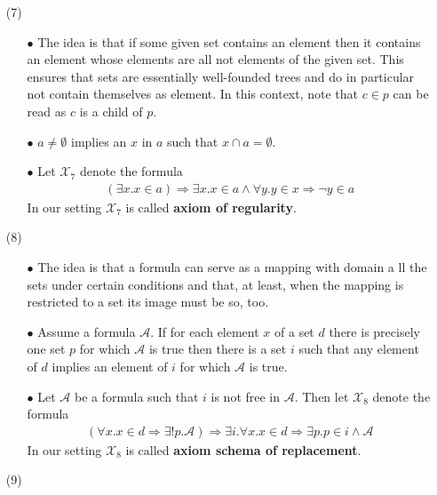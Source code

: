 \begin{enumerate}
\begin{enumerate}
\end{enumerate}
\item[(7)]
\begin{enumerate}
\item[$\bullet$]
The idea is that if some given set contains an element then it contains an element whose elements are all not elements of the given set. This ensures that sets are essentially well-founded trees and do in particular not contain themselves as element. In this context, note that $c \in p$ can be read as $c$ is a child of $p$.
\item[$\bullet$]
$a \neq \emptyset$ implies an $x$ in $a$ such that $x \cap a = \emptyset$.
\item[$\bullet$]
Let $\mathcal{X}_{7}$ denote the formula
\begin{align*}
  \left(
    \exists
    x
    .
    x
    \in
    a
  \right)
  \Rightarrow
  \exists
  x
  .
  x
  \in
  a
  \land
  \forall
  y
  .
  y
  \in
  x
  \Rightarrow
  \neg
  y
  \in
  a
\end{align*}
In our setting $\mathcal{X}_{7}$ is called \textbf{axiom of regularity}.
\end{enumerate}
\item[(8)]
\begin{enumerate}
\item[$\bullet$]
The idea is that a formula can serve as a mapping with domain a ll the sets under certain conditions and that, at least, when the mapping is restricted to a set its image must be so, too.
\item[$\bullet$]
Assume a formula $\mathcal{A}$. If for each element $x$ of a set $d$ there is precisely one set $p$ for which $\mathcal{A}$ is true then there is a set $i$ such that any element of $d$ implies an element of $i$ for which $\mathcal{A}$ is true.
\item[$\bullet$]
Let $\mathcal{A}$ be a formula such that $i$ is not free in $\mathcal{A}$. Then let $\mathcal{X}_{8}$ denote the formula
\begin{align*}
  \left(
    \forall
    x
    .
    x
    \in
    d
    \Rightarrow
    \exists!
    p
    .
    \mathcal{A}
  \right)
  \Rightarrow
  \exists
  i
  .
  \forall
  x
  .
  x
  \in
  d
  \Rightarrow
  \exists
  p
  .
  p
  \in
  i
  \land
  \mathcal{A}
\end{align*}
In our setting $\mathcal{X}_{8}$ is called \textbf{axiom schema of replacement}.
\end{enumerate}
\item[(9)]
\begin{enumerate}

\end{enumerate}
\end{enumerate}
